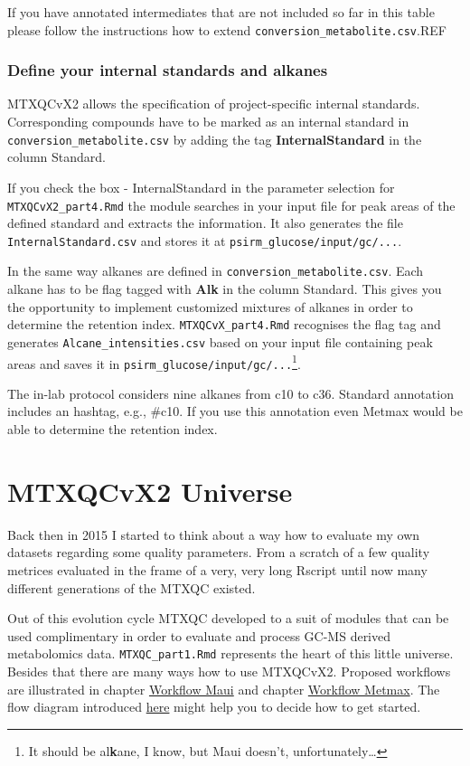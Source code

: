 \documentclass[]{book}
\let\rmarkdownfootnote\footnote%
\def\footnote{\protect\rmarkdownfootnote}
\theoremstyle{definition}
\theoremstyle{definition}
\theoremstyle{definition}
\theoremstyle{remark}
\begin{document}
If you have annotated intermediates that are not included so far in this
table please follow the instructions how to extend
\texttt{conversion\_metabolite.csv}.REF

\subsection{Define your internal standards and
alkanes}\label{define-your-internal-standards-and-alkanes}

MTXQCvX2 allows the specification of project-specific internal
standards. Corresponding compounds have to be marked as an internal
standard in \texttt{conversion\_metabolite.csv} by adding the tag
\textbf{InternalStandard} in the column Standard.

If you check the box - InternalStandard in the parameter selection for
\texttt{MTXQCvX2\_part4.Rmd} the module searches in your input file for
peak areas of the defined standard and extracts the information. It also
generates the file \texttt{InternalStandard.csv} and stores it at
\texttt{psirm\_glucose/input/gc/...}.

In the same way alkanes are defined in
\texttt{conversion\_metabolite.csv}. Each alkane has to be flag tagged
with \textbf{Alk} in the column Standard. This gives you the opportunity
to implement customized mixtures of alkanes in order to determine the
retention index. \texttt{MTXQCvX\_part4.Rmd} recognises the flag tag and
generates \texttt{Alcane\_intensities.csv} based on your input file
containing peak areas and saves it in
\texttt{psirm\_glucose/input/gc/...}\footnote{It should be
  al\textbf{k}ane, I know, but Maui doesn't, unfortunately\ldots{}}.

The in-lab protocol considers nine alkanes from c10 to c36. Standard
annotation includes an hashtag, e.g., \#c10. If you use this annotation
even Metmax would be able to determine the retention index.

\chapter{MTXQCvX2 Universe}\label{universe}

Back then in 2015 I started to think about a way how to evaluate my own
datasets regarding some quality parameters. From a scratch of a few
quality metrices evaluated in the frame of a very, very long Rscript
until now many different generations of the MTXQC existed.

Out of this evolution cycle MTXQC developed to a suit of modules that
can be used complimentary in order to evaluate and process GC-MS derived
metabolomics data. \texttt{MTXQC\_part1.Rmd} represents the heart of
this little universe. Besides that there are many ways how to use
MTXQCvX2. Proposed workflows are illustrated in chapter
\protect\hyperlink{wf:maui}{Workflow Maui} and chapter
\protect\hyperlink{wf:metmax}{Workflow Metmax}. The flow diagram
introduced \href{/ref@fig:flow}{here} might help you to decide how to
get started.
\end{document}
